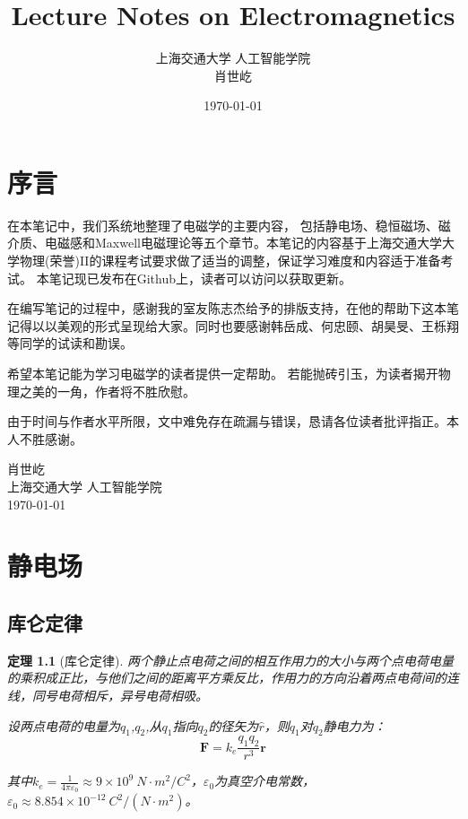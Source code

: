 \documentclass[12pt,a4paper,oneside]{report}
\title{\Huge\textbf{Lecture Notes on Electromagnetics}}
\author{\Large 上海交通大学 人工智能学院 \\
\Large 肖世屹}
\date{\today}
\newtheorem{theorem}{定理}[chapter]
\theoremstyle{definition}
\theoremstyle{remark}
\begin{document}
\maketitle
\thispagestyle{empty}
\clearpage
\chapter*{序言}

在本笔记中，我们系统地整理了电磁学的主要内容，
包括静电场、稳恒磁场、磁介质、电磁感和Maxwell电磁理论等五个章节。本笔记的内容基于上海交通大学大学物理(荣誉)II的课程考试要求做了适当的调整，保证学习难度和内容适于准备考试。
本笔记现已发布在Github上，读者可以访问以获取更新。

在编写笔记的过程中，感谢我的室友陈志杰给予的排版支持，在他的帮助下这本笔记得以以美观的形式呈现给大家。同时也要感谢韩岳成、何忠颐、胡昊旻、王栎翔等同学的试读和勘误。

希望本笔记能为学习电磁学的读者提供一定帮助。
若能抛砖引玉，为读者揭开物理之美的一角，作者将不胜欣慰。

由于时间与作者水平所限，文中难免存在疏漏与错误，恳请各位读者批评指正。本人不胜感谢。
\bigskip
\begin{flushright}
肖世屹 \\
上海交通大学 人工智能学院 \\
\today
\end{flushright}
\clearpage

\tableofcontents
\clearpage


\chapter{静电场}
\section{库仑定律}

\begin{theorem}[库仑定律]
两个静止点电荷之间的相互作用力的大小与两个点电荷电量的乘积成正比，与他们之间的距离平方乘反比，作用力的方向沿着两点电荷间的连线，同号电荷相斥，异号电荷相吸。

设两点电荷的电量为$q_1$,$q_2$,从$q_1$指向$q_2$的径矢为$\hat{r}$，则$q_1$对$q_2$静电力为：
\[
\mathbf{F} = k_e \frac{q_1 q_2}{r^3}\mathbf{r}
\]

其中$k_e = \frac{1}{4\pi \varepsilon_0} \approx 9\times 10^9\ N\cdot m^2/C^2$，$\varepsilon_0$为真空介电常数，$\varepsilon_0 \approx 8.854\times 10^{-12}\ C^2/(N\cdot m^2)$。
\end{theorem}
\end{document}
